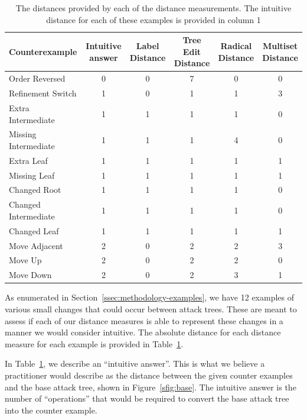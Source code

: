 \begin{table}[t]
\begin{tabular}{lccccc}
\toprule
Counterexample & \shortstack{Intuitive\\answer} & \shortstack{Label\\Distance} & \shortstack{Tree Edit\\Distance} & \shortstack{Radical\\Distance} & \shortstack{Multiset\\Distance} \\
\midrule
Order Reversed & 0 & 0 & 7 & 0 & 0 \\
Refinement Switch & 1 & 0 & 1 & 1 & 3 \\
Extra Intermediate & 1 & 1 & 1 & 1 & 0 \\
Missing Intermediate & 1 & 1 & 1 & 4 & 0 \\
Extra Leaf & 1 & 1 & 1 & 1 & 1 \\
Missing Leaf & 1 & 1 & 1 & 1 & 1 \\
Changed Root & 1 & 1 & 1 & 1 & 0 \\
Changed Intermediate & 1 & 1 & 1 & 1 & 0 \\
Changed Leaf & 1 & 1 & 1 & 1 & 1 \\
Move Adjacent & 2 & 0 & 2 & 2 & 3 \\
Move Up & 2 & 0 & 2 & 2 & 0 \\
Move Down & 2 & 0 & 2 & 3 & 1 \\
\bottomrule
    \end{tabular}
\caption{The distances provided by each of the distance measurements. The intuitive distance for each of these examples is provided in column 1}
\label{tab:counterexamples}
\end{table}

As enumerated in Section~\ref{ssec:methodology-examples}, we have 12 examples of various small changes that could occur between attack trees. These are meant to assess if each of our distance measures is able to represent these changes in a manner we would consider intuitive. The absolute distance for each distance measure for each example is provided in Table~\ref{tab:counterexamples}.

In Table~\ref{tab:counterexamples}, we describe an ``intuitive answer''. This is what we believe a practitioner would describe as the distance between the given counter examples and the base attack tree, shown in Figure~\ref{sfig:base}. The intuitive answer is the number of ``operations'' that would be required to convert the base attack tree into the counter example.

